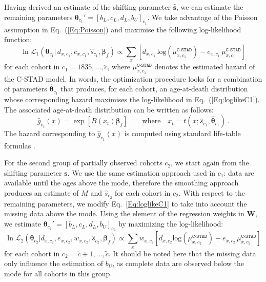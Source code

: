 \documentclass[11pt, a4paper]{article}
\begin{document}
Having derived an estimate of the shifting parameter $\hat{\bm{s}}$, we can estimate the remaining parameters $\bm{\theta}_{c_{1}}'=\left[b_{L},c_{L},d_{L},b_{U}\right]_{c_{1}}$. We take advantage of the Poisson assumption in Eq.~(\ref{Eq:Poisson}) and maximise the following log-likelihood function:
%
\begin{equation}\label{Eq:loglikeC1}
\ln\mathcal{L}_1\left(\bm{\theta}_{c_{1}} | \, d_{x,c_{1}} , e_{x,c_{1}} , \hat{s}_{c_{1}}, \bm{\beta}_{f}
\right) \propto \sum_{x} \left[  d_{x,c_{1}} \,
\mathrm{log} \left( \mu^{\texttt{C-STAD}}_{x,c_{1}}  \right) - e_{x,c_{1}}
\, \mu^{\texttt{C-STAD}}_{x,c_{1}} \right] 
\end{equation}
%
for each cohort in $c_{1} = 1835,\ldots,\breve{c}$, where $\mu^{\texttt{C-STAD}}_{x,c_{1}}$ denotes the estimated hazard of the C-STAD model. In words, the optimization procedure looks for a combination of parameters $\hat{\bm{\theta}}_{c_{1}}$ that produces, for each cohort, an age-at-death distribution
whose corresponding hazard maximises the log-likelihood in Eq.~(\ref{Eq:loglikeC1}). The associated age-at-death distribution can be written as follows:
\begin{equation}\label{eq:gBspl}
\hat{g}_{c_{1}}(x) = \exp\left[ B(x_{t}) \bm{\beta}_{f} \right] \qquad \mbox{where} \quad x_{t} = t(x; \hat{s}_{c_{1}},\hat{\bm{\theta}}_{c_{1}}) \, .
\end{equation}
The hazard corresponding to $\hat{g}_{c_{1}}(x)$ is computed using standard life-table formulas \citep{preston2001demogr}.

For the second group of partially observed cohorts $c_2$, we start again from the shifting parameter $\bm{s}$. We use the same estimation approach used in $c_1$: data are available until the ages above the mode, therefore the smoothing approach produces an estimate of $M$ and $\hat{s}_{c_{2}}$ for each cohort in $c_2$. With respect to the remaining parameters, we modify Eq.~\eqref{Eq:loglikeC1} to take into account the missing data above the mode. Using the element of the regression weights in $\bm{W}$, we estimate $\bm{\theta}_{c_{2}}'=\left[b_{L},c_{L},d_{L},b_{U}\right]_{c_{2}}$ by maximizing the log-likelihood:
%
\begin{equation}\label{Eq:loglikeC2}
\ln\mathcal{L}_2\left(\bm{\theta}_{c_{2}} | d_{x,c_{2}} , e_{x,c_{2}} , w_{x,c_{2}} , \hat{s}_{c_{2}}, \bm{\beta}_{f}
\right) \propto \sum_{x} w_{x,c_{2}} \left[  d_{x,c_{2}} \mathrm{log} \left( \mu^{\texttt{C-STAD}}_{x,c_{2}}  \right) - e_{x,c_{2}}
\, \mu^{\texttt{C-STAD}}_{x,c_{2}} \right] 
\end{equation}
%
for each cohort in $c_{2}=\breve{c}+1,\ldots,\tilde{c}$. It should be noted here that the missing data only influence the estimation of $b_U$, as complete data are observed below the mode for all cohorts in this group. 
\end{document}
